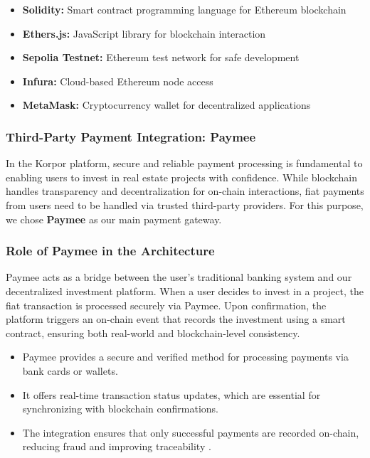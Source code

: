 \begin{itemize}
    \item \textbf{Solidity:} Smart contract programming language for Ethereum blockchain \cite{SolidityDocs}
    \item \textbf{Ethers.js:} JavaScript library for blockchain interaction \cite{EthersJSDocs}
    \item \textbf{Sepolia Testnet:} Ethereum test network for safe development
    \item \textbf{Infura:} Cloud-based Ethereum node access \cite{InfuraWeb3}
    \item \textbf{MetaMask:} Cryptocurrency wallet for decentralized applications \cite{MetaMaskDocs}
\end{itemize}

\subsubsection{Third-Party Payment Integration: Paymee}

In the Korpor platform, secure and reliable payment processing is fundamental to enabling users to invest in real estate projects with confidence. While blockchain handles transparency and decentralization for on-chain interactions, fiat payments from users need to be handled via trusted third-party providers. For this purpose, we chose \textbf{Paymee} as our main payment gateway.


\subsubsection{Role of Paymee in the Architecture}

Paymee acts as a bridge between the user's traditional banking system and our decentralized investment platform. When a user decides to invest in a project, the fiat transaction is processed securely via Paymee. Upon confirmation, the platform triggers an on-chain event that records the investment using a smart contract, ensuring both real-world and blockchain-level consistency.

\begin{itemize}
    \item Paymee provides a secure and verified method for processing payments via bank cards or wallets.
    \item It offers real-time transaction status updates, which are essential for synchronizing with blockchain confirmations.
    \item The integration ensures that only successful payments are recorded on-chain, reducing fraud and improving traceability \cite{Bamakan2020BlockchainPayment}.
\end{itemize}

